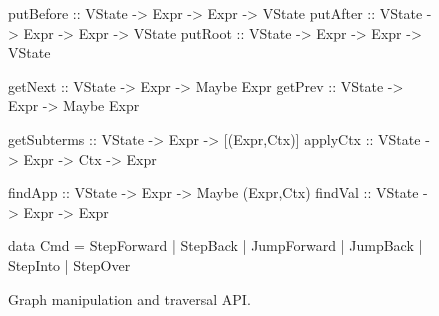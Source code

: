 \begin{figure}[t]
\centering
\begin{mcode}
 putBefore :: VState -> Expr -> Expr -> VState
 putAfter  :: VState -> Expr -> Expr -> VState
 putRoot   :: VState -> Expr -> Expr -> VState

 getNext   :: VState -> Expr -> Maybe Expr
 getPrev   :: VState -> Expr -> Maybe Expr

 getSubterms :: VState -> Expr -> [(Expr,Ctx)]
 applyCtx    :: VState -> Expr -> Ctx -> Expr
 
 findApp :: VState -> Expr -> Maybe (Expr,Ctx)
 findVal :: VState -> Expr -> Expr
 
 data Cmd = StepForward | StepBack
          | JumpForward | JumpBack
          | StepInto    | StepOver
\end{mcode}
\caption{Graph manipulation and traversal API.}
\label{fig:graph-api}
\end{figure}
